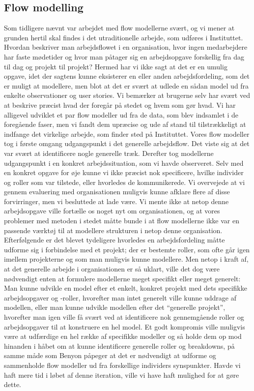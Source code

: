 \subsection{Flow modelling}
Som tidligere nævnt var arbejdet med flow modellerne svært, og vi mener at grunden hertil skal findes i det utraditionelle arbejde, som udføres i Instituttet. Hvordan beskriver man arbejdsflowet i en organisation, hvor ingen medarbejdere har faste mødetider og hvor man påtager sig en arbejdsopgave forskellig fra dag til dag og projekt til projekt? Hermed har vi ikke sagt at det er en umulig opgave, idet der sagtens kunne eksisterer en eller anden arbejdsfordeling, som det er muligt at modellere, men blot at det er svært at udlede en sådan model ud fra enkelte observationer og user stories. Vi bemærker at brugerne selv har svært ved at beskrive præcist hvad der foregår på stedet og hvem som gør hvad.
Vi har alligevel udviklet et par flow modeller ud fra de data, som blev indsamlet i de foregående faser, men vi fandt dem upræcise og ude af stand til tilstrækkeligt at indfange det virkelige arbejde, som finder sted på Instituttet. 
Vores flow modeller tog i første omgang udgangspunkt i det generelle arbejdsflow. Det viste sig at det var svært at identificere nogle generelle træk. Derefter tog modellerne udgangspunkt i en konkret arbejdssituation, som vi havde observeret. Selv med en konkret opgave for øje kunne vi ikke præcist nok specificere, hvilke individer og roller som var tilstede, eller hvorledes de kommunikerede.
Vi overvejede at vi gennem evaluering med organisationen muligvis kunne afklare flere af disse forvirringer, men vi besluttede at lade være. Vi mente ikke at netop denne arbejdsopgave ville fortælle os noget nyt om organisationen, og at vores problemer med metoden i stedet måtte bunde i at flow modellerne ikke var en passende værktøj til at modellere strukturen i netop denne organisation.
Efterfølgende er det blevet tydeligere hvorledes en arbejdsfordeling måtte udforme sig i forbindelse med et projekt; der er bestemte roller, som ofte går igen imellem projekterne og som man muligvis kunne modellere. Men netop i kraft af, at det generelle arbejde i organisationen er så uklart, ville det dog være nødvendigt enten at formulere modellerne meget specifikt eller meget generelt: Man kunne udvikle en model efter et enkelt, konkret projekt med dets specifikke arbejdsopgaver og -roller, hvorefter man intet generelt ville kunne uddrage af modellen, eller man kunne udvikle modellen efter det “generelle projekt”, hvorefter man igen ville få svært ved at identificere nok gennemgående roller og arbejdsopgaver til at konstruere en hel model.
Et godt kompromis ville muligvis være at udfærdige en hel række af specifikke modeller og så holde dem op mod hinanden i håbet om at kunne identificere generelle roller og breakdowns, på samme måde som Benyon påpeger at det er nødvendigt at udforme og sammenholde flow modeller ud fra forskellige individers synspunkter. Havde vi haft mere tid i løbet af denne iteration, ville vi have haft mulighed for at gøre dette.

